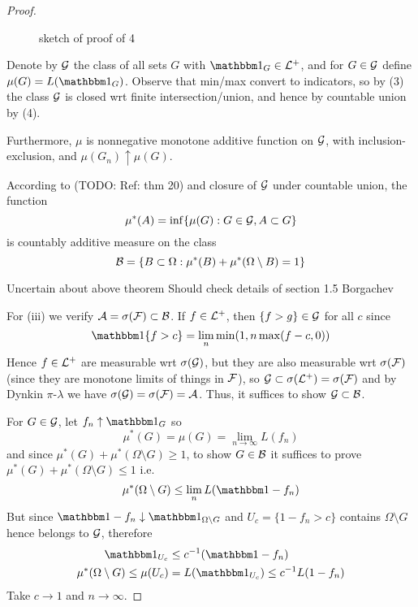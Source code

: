 \begin{proof}
  \begin{figure}[H]
    \centering
    \caption{sketch of proof of 4}
    \label{fig:sketch-of-proof-of-4}
  \end{figure}

  Denote by $\mathcal{G}$ the class of all sets $G$ with $\ind_{G} \in \cL^+$,
  and for $G \in \mathcal{G}$ define $\mu(G) = L(\ind_{G})$.
  Observe that min/max convert to indicators, so by (3) the class
  $\mathcal{G}$ is closed wrt finite intersection/union, and hence by countable
  union by (4).

  Furthermore, $\mu$ is nonnegative monotone additive function on $\mathcal{G}$,
  with inclusion-exclusion, and $\mu(G_n) \uparrow \mu(G)$.

  According to (TODO: Ref: thm 20) and closure of $\mathcal{G}$ under countable union,
  the function
  \[
    \mu^*(A) = \inf\{\mu(G) : G \in \mathcal{G}, A \subset G\}
  \]
  is countably additive measure on the class
  \[
    \mathcal{B} = \{B \subset \Omega: \mu^*(B) + \mu^*(\Omega \setminus B) = 1\}
  \]
  \begin{note}{Uncertain about above theorem}
    Should check details of section 1.5 Borgachev
  \end{note}

  For (iii) we verify $\mathcal{A} = \sigma(\mathcal{F}) \subset \mathcal{B}$. If $f \in \mathcal{L}^+$, then
  $\{f > g\} \in \mathcal{G}$ for all $c$ since
  \[
    \ind\{f > c\} = \lim_n \min(1, n \max(f - c, 0))
  \]
  Hence $f \in \mathcal{L}^+$ are measurable wrt $\sigma(\mathcal{G})$, but they are also
  measurable wrt $\sigma(\mathcal{F})$ (since they are monotone limits of things in
  $\mathcal{F}$), so $\mathcal{G} \subset \sigma(\mathcal{L}^+) = \sigma(\mathcal{F})$ and by Dynkin
  $\pi$-$\lambda$ we have $\sigma(\mathcal{G}) = \sigma(\mathcal{F}) = \mathcal{A}$. Thus, it suffices
  to show $\mathcal{G} \subset \mathcal{B}$.

  For $G \in \mathcal{G}$, let $f_n \uparrow \ind_{G}$ so
  \[
    \mu^*(G) = \mu(G) = \lim_{n \to \infty} L(f_n)
  \]
  and since $\mu^*(G) + \mu^*(\Omega \setminus G) \geq 1$, to show
  $G \in \mathcal{B}$ it suffices to prove $\mu^*(G) + \mu^*(\Omega \setminus G) \leq 1$
  i.e.
  \[
    \mu^*(\Omega \setminus G) \leq \lim_n L(\ind - f_n)
  \]
  But since $\ind - f_n \downarrow \ind_{\Omega \setminus G}$
  and $U_c = \{1 - f_n > c\}$ contains $\Omega \setminus G$
  hence belongs to $\mathcal{G}$, therefore
  \begin{align*}
    \ind_{U_c} &\leq c^{-1}(\ind - f_n) \\
    \mu^*(\Omega \setminus G) \leq \mu(U_c) &= L(\ind_{U_c}) \leq c^{-1} L(1 - f_n)
  \end{align*}
  Take $c \to 1$ and $n \to \infty$.


\end{proof}
